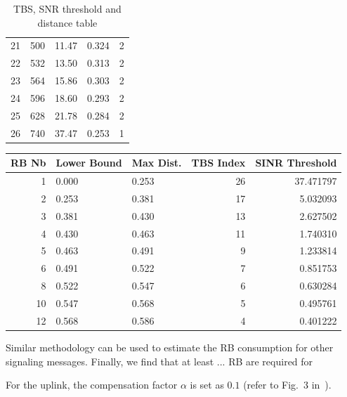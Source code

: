 \begin{table}
\begin{tabular}{rrllr}
		21 &  500 &          11.47 &     0.324 &      2 \\
		22 &  532 &          13.50 &     0.313 &      2 \\
		23 &  564 &          15.86 &     0.303 &      2 \\
		24 &  596 &          18.60 &     0.293 &      2 \\
		25 &  628 &          21.78 &     0.284 &      2 \\
		26 &  740 &          37.47 &     0.253 &      1 \\
		\bottomrule
	\end{tabular}
	\caption{TBS, SNR threshold and distance table}
	\label{tab:tbs-distance}
\end{table}


\begin{tabular}{rllrr}
	\toprule
	RB Nb & Lower Bound & Max Dist. &  TBS Index &  SINR Threshold \\
	\midrule
	1 &       0.000 &     0.253 &         26 &       37.471797 \\
	2 &       0.253 &     0.381 &         17 &        5.032093 \\
	3 &       0.381 &     0.430 &         13 &        2.627502 \\
	4 &       0.430 &     0.463 &         11 &        1.740310 \\
	5 &       0.463 &     0.491 &          9 &        1.233814 \\
	6 &       0.491 &     0.522 &          7 &        0.851753 \\
	8 &       0.522 &     0.547 &          6 &        0.630284 \\
	10 &       0.547 &     0.568 &          5 &        0.495761 \\
	12 &       0.568 &     0.586 &          4 &        0.401222 \\
	\bottomrule
\end{tabular}





Similar methodology can be used to estimate the RB consumption for other signaling messages. Finally, we find that at least ... RB are required for 


For the uplink, the compensation factor $\alpha$ is set as $0.1$ (refer to Fig.~$3$ in~\cite{coupechoux2011set}).

